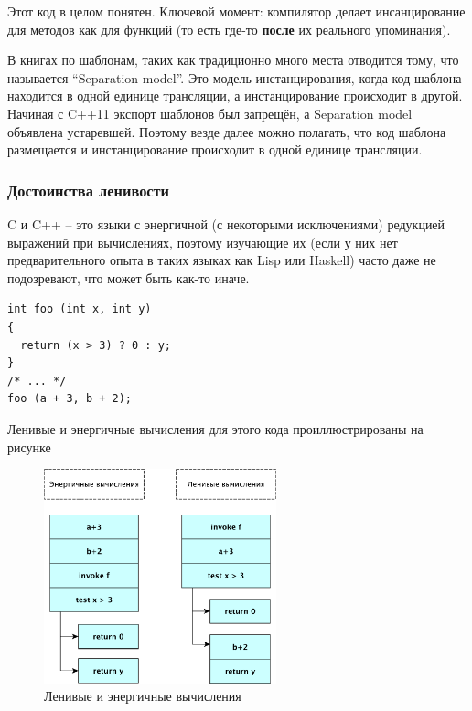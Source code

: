 \documentclass[a4paper,12pt,oneside]{article}
\begin{document}
Этот код в целом понятен. Ключевой момент: компилятор делает инсанцирование для методов как для функций (то есть где-то \textbf{после} их реального упоминания).

В книгах по шаблонам, таких как \cite{vandervoord} традиционно много места отводится тому, что называется ``Separation model''. Это модель инстанцирования, когда код шаблона находится в одной единице трансляции, а инстанцирование происходит в другой. Начиная с C++11 экспорт шаблонов был запрещён, а Separation model объявлена устаревшей. Поэтому везде далее можно полагать, что код шаблона размещается и инстанцирование происходит в одной единице трансляции.

\pagebreak
\subsubsection{Достоинства ленивости}\label{Lazyness}

C и C++ -- это языки с энергичной (с некоторыми исключениями) редукцией выражений при вычислениях, поэтому изучающие их (если у них нет предварительного опыта в таких языках как Lisp или Haskell) часто даже не подозревают, что может быть как-то иначе.

\begin{lstlisting}
int foo (int x, int y)
{
  return (x > 3) ? 0 : y;
}
/* ... */
foo (a + 3, b + 2);
\end{lstlisting}

Ленивые и энергичные вычисления для этого кода проиллюстрированы на рисунке

\begin{figure}[h!]
\centering
\includegraphics[width=0.6\textwidth]{illustrations/lazyorder-crop.pdf}
\caption{Ленивые и энергичные вычисления}
\label{fig:lazy_calc}
\end{figure}
\end{document}

